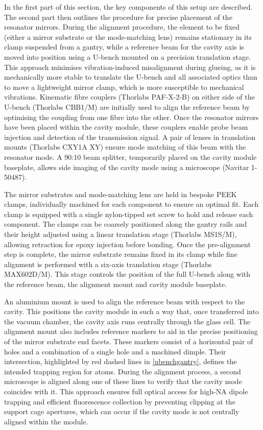 \documentclass[../Thesis-IJspeert.tex]{subfiles}
\begin{document}
In the first part of this section, the key components of this setup are described. The second part then outlines the procedure for precise placement of the resonator mirrors. During the alignment procedure, the element to be fixed (either a mirror substrate or the mode-matching lens) remains stationary in its clamp suspended from a gantry, while a reference beam for the cavity axis is moved into position using a U-bench mounted on a precision translation stage. This approach minimises vibration-induced misalignment during glueing, as it is mechanically more stable to translate the U-bench and all associated optics than to move a lightweight mirror clamp, which is more susceptible to mechanical vibrations. Kinematic fibre couplers (Thorlabs PAF-X-2-B) on either side of the U-bench (Thorlabs CBB1/M) are initially used to align the reference beam by optimising the coupling from one fibre into the other. Once the resonator mirrors have been placed within the cavity module, these couplers enable probe beam injection and detection of the transmission signal. A pair of lenses in translation mounts (Thorlabs CXY1A XY) ensure mode matching of this beam with the resonator mode. A \num{90}:\num{10} beam splitter, temporarily placed on the cavity module baseplate, allows side imaging of the cavity mode using a microscope (Navitar 1-50487).

The mirror substrates and mode-matching lens are held in bespoke PEEK clamps, individually machined for each component to ensure an optimal fit. Each clamp is equipped with a single nylon-tipped set screw to hold and release each component. The clamps can be coarsely positioned along the gantry rails and their height adjusted using a linear translation stage (Thorlabs MS1S/M), allowing retraction for epoxy injection before bonding. Once the pre-alignment step is complete, the mirror substrate remains fixed in its clamp while fine alignment is performed with a six-axis translation stage (Thorlabs MAX602D/M). This stage controls the position of the full U-bench along with the reference beam, the alignment mount and cavity module baseplate.

An aluminium mount is used to align the reference beam with respect to the cavity. This positions the cavity module in such a way that, once transferred into the vacuum chamber, the cavity axis runs centrally through the glass cell. The alignment mount also includes reference markers to aid in the precise positioning of the mirror substrate end facets. These markers consist of a horizontal pair of holes and a combination of a single hole and a machined dimple. Their intersection, highlighted by red dashed lines in \autoref{ubenchgantry}, defines the intended trapping region for atoms. During the alignment process, a second microscope is aligned along one of these lines to verify that the cavity mode coincides with it. This approach ensures full optical access for high-NA dipole trapping and efficient fluorescence collection by preventing clipping at the support cage apertures, which can occur if the cavity mode is not centrally aligned within the module.
\end{document}
